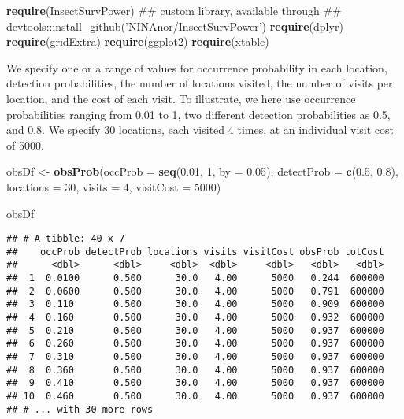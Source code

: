 \documentclass[]{article}
\newenvironment{Shaded}{\begin{snugshade}}{\end{snugshade}}
\newcommand{\KeywordTok}[1]{\textcolor[rgb]{0.13,0.29,0.53}{\textbf{#1}}}
\newcommand{\DataTypeTok}[1]{\textcolor[rgb]{0.13,0.29,0.53}{#1}}
\newcommand{\DecValTok}[1]{\textcolor[rgb]{0.00,0.00,0.81}{#1}}
\newcommand{\FloatTok}[1]{\textcolor[rgb]{0.00,0.00,0.81}{#1}}
\newcommand{\StringTok}[1]{\textcolor[rgb]{0.31,0.60,0.02}{#1}}
\newcommand{\NormalTok}[1]{#1}
\begin{document}
\begin{Shaded}
\begin{Highlighting}[]
\KeywordTok{require}\NormalTok{(InsectSurvPower)}
\NormalTok{## custom library, available through}
\NormalTok{## devtools::install_github('NINAnor/InsectSurvPower')}
\KeywordTok{require}\NormalTok{(dplyr)}
\KeywordTok{require}\NormalTok{(gridExtra)}
\KeywordTok{require}\NormalTok{(ggplot2)}
\KeywordTok{require}\NormalTok{(xtable)}
\end{Highlighting}
\end{Shaded}

We specify one or a range of values for occurrence probability in each
location, detection probabilities, the number of locations visited, the
number of visits per location, and the cost of each visit. To
illustrate, we here use occurrence probabilities ranging from 0.01 to 1,
two different detection probabilities as 0.5, and 0.8. We specify 30
locations, each visited 4 times, at an individual visit cost of 5000.

\begin{Shaded}
\begin{Highlighting}[]
\NormalTok{obsDf <-}\StringTok{ }\KeywordTok{obsProb}\NormalTok{(}\DataTypeTok{occProb =} \KeywordTok{seq}\NormalTok{(}\FloatTok{0.01}\NormalTok{, }\DecValTok{1}\NormalTok{, }\DataTypeTok{by =} \FloatTok{0.05}\NormalTok{), }\DataTypeTok{detectProb =} \KeywordTok{c}\NormalTok{(}\FloatTok{0.5}\NormalTok{, }\FloatTok{0.8}\NormalTok{), }
    \DataTypeTok{locations =} \DecValTok{30}\NormalTok{, }\DataTypeTok{visits =} \DecValTok{4}\NormalTok{, }\DataTypeTok{visitCost =} \DecValTok{5000}\NormalTok{)}

\NormalTok{obsDf}
\end{Highlighting}
\end{Shaded}

\begin{verbatim}
## # A tibble: 40 x 7
##    occProb detectProb locations visits visitCost obsProb totCost
##      <dbl>      <dbl>     <dbl>  <dbl>     <dbl>   <dbl>   <dbl>
##  1  0.0100      0.500      30.0   4.00      5000   0.244  600000
##  2  0.0600      0.500      30.0   4.00      5000   0.791  600000
##  3  0.110       0.500      30.0   4.00      5000   0.909  600000
##  4  0.160       0.500      30.0   4.00      5000   0.932  600000
##  5  0.210       0.500      30.0   4.00      5000   0.937  600000
##  6  0.260       0.500      30.0   4.00      5000   0.937  600000
##  7  0.310       0.500      30.0   4.00      5000   0.937  600000
##  8  0.360       0.500      30.0   4.00      5000   0.937  600000
##  9  0.410       0.500      30.0   4.00      5000   0.937  600000
## 10  0.460       0.500      30.0   4.00      5000   0.937  600000
## # ... with 30 more rows
\end{verbatim}
\end{document}
